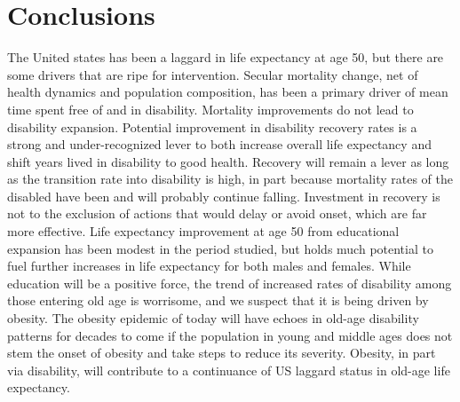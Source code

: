 \section{Conclusions}
The United states has been a laggard in life expectancy at age 50, but there are some drivers that are ripe for intervention. Secular mortality change, net of health dynamics and population composition, has been a primary driver of mean time spent free of and in disability. Mortality improvements do not lead to disability expansion. Potential improvement in disability recovery rates is a strong and under-recognized lever to both increase overall life expectancy and shift years lived in disability to good health. Recovery will remain a lever as long as the transition rate into disability is high, in part because mortality rates of the disabled have been and will probably continue falling. Investment in recovery is not to the exclusion of actions that would delay or avoid onset, which are far more effective. Life expectancy improvement at age 50 from educational expansion has been modest in the period studied, but holds much potential to fuel further increases in life expectancy for both males and females. While education will be a positive force, the trend of increased rates of disability among those entering old age is worrisome, and we suspect that it is being driven by obesity. The obesity epidemic of today will have echoes in old-age disability patterns for decades to come if the population in young and middle ages does not stem the onset of obesity and take steps to reduce its severity. Obesity, in part via disability, will contribute to a continuance of US laggard status in old-age life expectancy.  



